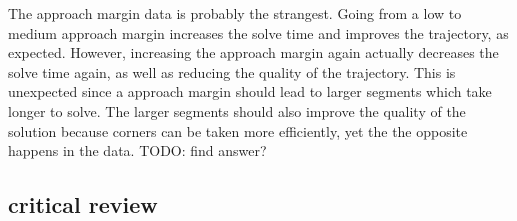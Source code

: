 The approach margin data is probably the strangest. Going from a low to medium approach margin increases the solve time and improves the trajectory, as expected. However, increasing the approach margin again actually decreases the solve time again, as well as reducing the quality of the trajectory. This is unexpected since a approach margin should lead to larger segments which take longer to solve. The larger segments should also improve the quality of the solution because corners can be taken more efficiently, yet the the opposite happens in the data. TODO: find answer?






%

\subsection{critical review}